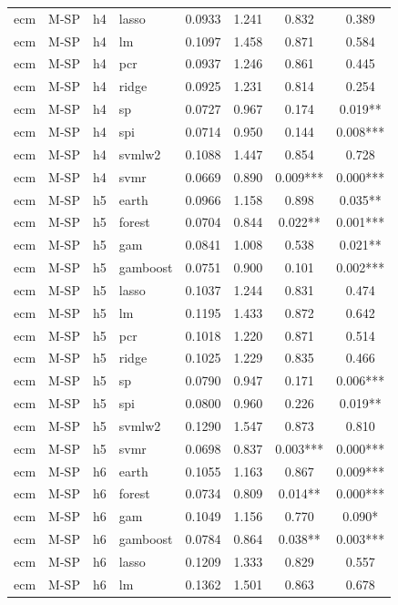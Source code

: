 \begin{ThreePartTable}
\begin{longtable}[t]{llclcccc}
ecm & M-SP & h4 & lasso & 0.0933 & 1.241 & 0.832 & 0.389\\
ecm & M-SP & h4 & lm & 0.1097 & 1.458 & 0.871 & 0.584\\
ecm & M-SP & h4 & pcr & 0.0937 & 1.246 & 0.861 & 0.445\\
ecm & M-SP & h4 & ridge & 0.0925 & 1.231 & 0.814 & 0.254\\
ecm & M-SP & h4 & sp & 0.0727 & 0.967 & 0.174 & 0.019**\\
ecm & M-SP & h4 & spi & 0.0714 & 0.950 & 0.144 & 0.008***\\
ecm & M-SP & h4 & svmlw2 & 0.1088 & 1.447 & 0.854 & 0.728\\
ecm & M-SP & h4 & svmr & 0.0669 & 0.890 & 0.009*** & 0.000***\\
\addlinespace
ecm & M-SP & h5 & earth & 0.0966 & 1.158 & 0.898 & 0.035**\\
ecm & M-SP & h5 & forest & 0.0704 & 0.844 & 0.022** & 0.001***\\
ecm & M-SP & h5 & gam & 0.0841 & 1.008 & 0.538 & 0.021**\\
ecm & M-SP & h5 & gamboost & 0.0751 & 0.900 & 0.101 & 0.002***\\
ecm & M-SP & h5 & lasso & 0.1037 & 1.244 & 0.831 & 0.474\\
ecm & M-SP & h5 & lm & 0.1195 & 1.433 & 0.872 & 0.642\\
ecm & M-SP & h5 & pcr & 0.1018 & 1.220 & 0.871 & 0.514\\
ecm & M-SP & h5 & ridge & 0.1025 & 1.229 & 0.835 & 0.466\\
ecm & M-SP & h5 & sp & 0.0790 & 0.947 & 0.171 & 0.006***\\
ecm & M-SP & h5 & spi & 0.0800 & 0.960 & 0.226 & 0.019**\\
ecm & M-SP & h5 & svmlw2 & 0.1290 & 1.547 & 0.873 & 0.810\\
ecm & M-SP & h5 & svmr & 0.0698 & 0.837 & 0.003*** & 0.000***\\
\addlinespace
ecm & M-SP & h6 & earth & 0.1055 & 1.163 & 0.867 & 0.009***\\
ecm & M-SP & h6 & forest & 0.0734 & 0.809 & 0.014** & 0.000***\\
ecm & M-SP & h6 & gam & 0.1049 & 1.156 & 0.770 & 0.090*\\
ecm & M-SP & h6 & gamboost & 0.0784 & 0.864 & 0.038** & 0.003***\\
ecm & M-SP & h6 & lasso & 0.1209 & 1.333 & 0.829 & 0.557\\
ecm & M-SP & h6 & lm & 0.1362 & 1.501 & 0.863 & 0.678\\

\end{longtable}
\end{ThreePartTable}
